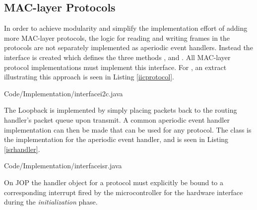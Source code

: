 \subsection{MAC-layer Protocols} %
\label{sub:mac_layer_protocols}
In order to achieve modularity and simplify the implementation effort of adding more MAC-layer protocols, the logic for reading and writing frames in the protocols are not separately implemented as aperiodic event handlers. Instead the interface  is created which defines the three methods ,  and . All MAC-layer protocol implementations must implement this interface. For \iic, an extract illustrating this approach is seen in Listing \ref{iicprotocol}.


{Code/Implementation/interfacei2c.java}

The Loopback is implemented by simply placing packets back to the routing handler's packet queue upon transmit. A common aperiodic event handler implementation can then be made that can be used for any protocol. The class  is the implementation for the aperiodic event handler, and is seen in Listing \ref{isrhandler}.

{Code/Implementation/interfaceisr.java}

On JOP the handler object for a protocol must explicitly be bound to a corresponding interrupt fired by the microcontroller for the hardware interface during the \textit{initialization} phase.

